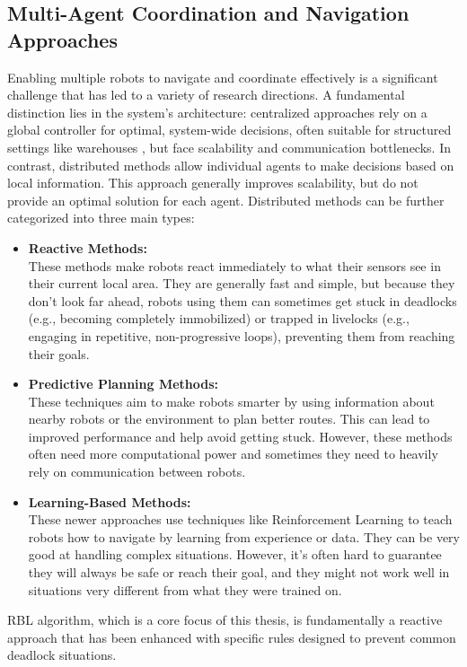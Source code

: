   \subsection{Multi-Agent Coordination and Navigation Approaches}
    Enabling multiple robots to navigate and coordinate effectively is a significant challenge that has led to a variety of research directions.
    A fundamental distinction lies in the system's architecture: centralized approaches rely on a global controller for optimal, system-wide decisions, often suitable for structured settings like warehouses \cite{warehouse_intro}, but face scalability and communication bottlenecks.
    In contrast, distributed methods allow individual agents to make decisions based on local information.
    This approach generally improves scalability, but do not provide an optimal solution for each agent. 
    Distributed methods can be further categorized into three main types: 
    \begin{itemize}
      \item \textbf{Reactive Methods: } \\
        These methods \cite{reactive1, reactive2} make robots react immediately to what their sensors see in their current local area. 
        They are generally fast and simple, but because they don't look far ahead, robots using them can sometimes get stuck in deadlocks (e.g., becoming completely immobilized) or trapped in livelocks (e.g., engaging in repetitive, non-progressive loops), preventing them from reaching their goals.
      \item \textbf{Predictive Planning Methods: } \\
        These techniques \cite{predictive1, predictive2} aim to make robots smarter by using information about nearby robots or the environment to plan better routes. 
        This can lead to improved performance and help avoid getting stuck. 
        However, these methods often need more computational power and sometimes they need to heavily rely on communication between robots.
      \item \textbf{Learning-Based Methods: } \\
        These newer approaches \cite{rl1, rl2} use techniques like Reinforcement Learning to teach robots how to navigate by learning from experience or data. 
        They can be very good at handling complex situations. 
        However, it's often hard to guarantee they will always be safe or reach their goal, and they might not work well in situations very different from what they were trained on.
    \end{itemize}
    \ac{RBL} algorithm, which is a core focus of this thesis, is fundamentally a reactive approach that has been enhanced with specific rules designed to prevent common deadlock situations.



